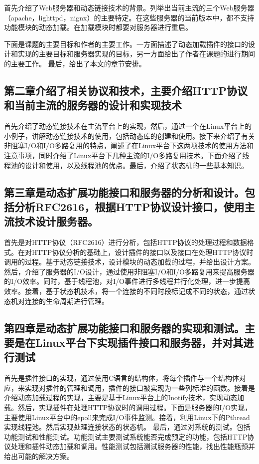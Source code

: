 \documentclass[12pt, twoside, a4paper, xetex]{report}
\begin{document}
	首先介绍了Web服务器和动态链接技术的背景。列举出当前主流的三个Web服务器（apache，lighttpd，nignx）的主要特定。在这些服务器的当前版本中，都不支持功能模块的动态加载。在加载模块时都要对服务器进行重启。
	
	下面是课题的主要目标和作者的主要工作。一方面描述了动态加载插件的接口的设计和实现的主要目标和服务器实现的目标，另一方面给出了作者在课题的进行期间的主要工作。
	最后，给出了本文的章节安排。
	
	\subsection*{第二章介绍了相关协议和技术，主要介绍HTTP协议和当前主流的服务器的设计和实现技术}
		首先介绍了动态链接技术在主流平台上的实现，然后，通过一个在Linux平台上的小例子，讲解动态链接技术的使用，包括动态库的创建和使用。接下来介绍了有关非阻塞I/O和I/O多路复用的特点，阐述了在Linux平台下这两项技术的使用方法和注意事项，同时介绍了Linux平台下几种主流的I/O多路复用技术。下面介绍了线程池的设计和使用，以及线程池的优点。最后，介绍了状态机的一些基本知识。
		
	\subsection*{第三章是动态扩展功能接口和服务器的分析和设计。包括分析RFC2616，根据HTTP协议设计接口，使用主流技术设计服务器。}
		首先是对HTTP协议（RFC2616）进行分析，包括HTTP协议的处理过程和数据格式。在对HTTP协议分析的基础上，设计插件的接口以及接口在处理HTTP协议时调用的过程。基于动态链接技术，设计模块的动态加载的过程，并给出设计方案。
		然后，介绍了服务器的I/O设计，通过使用非阻塞I/O和I/O多路复用来提高服务器的I/O效率。同时，基于线程池，对I/O事件进行多线程并行化处理，进一步提高效率。接着，基于状态机技术，将一个连接的不同时段标记成不同的状态，通过状态机对连接的生命周期进行管理。
	
	\subsection*{第四章是动态扩展功能接口和服务器的实现和测试。主要是在Linux平台下实现插件接口和服务器，并对其进行测试}
		首先是插件接口的实现，通过使用C语言的结构体，将每个插件与一个结构体对应，来实现对插件的管理和调用，插件的接口被实现为一些列标准的函数。接着是介绍动态加载过程的实现，主要是基于Linux平台上的Inotify技术，实现动态加载。然后，实现插件在处理HTTP协议时的调用过程。下面是服务器的I/O实现，主要使用Linux平台中的epoll来完成I/O事件监测。接着，利用Linux下的Pthread实现线程池。然后实现处理连接状态的状态机。
		最后，通过对系统的测试。包括功能测试和性能测试。功能测试主要测试系统能否完成预定的功能，包括HTTP协议处理和插件动态加载和调用。性能测试包括测试服务器的性能，找出性能瓶颈并给出可能的解决方案。
\end{document}
